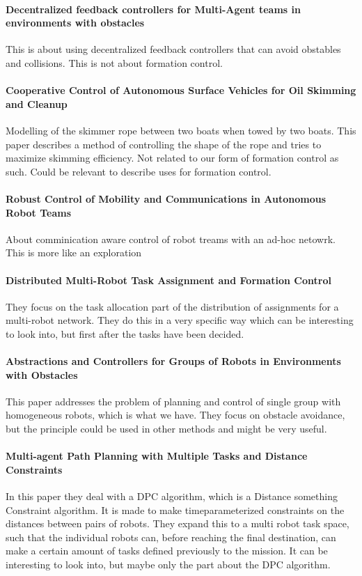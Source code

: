 {\vskip0pt\color{gray}
\paragraph{Decentralized feedback controllers for Multi-Agent teams in environments with obstacles}
	This is about using decentralized feedback controllers that can
	avoid obstables and collisions. This is not about formation control.}

{\vskip0pt\color{gray}
\paragraph{Cooperative Control of Autonomous Surface Vehicles for Oil Skimming and Cleanup}
	Modelling of the skimmer rope between two boats when towed by two
	boats. This paper describes a method of controlling the shape of the
	rope and tries to maximize skimming efficiency. Not related to our
	form of formation control as such. Could be relevant to describe uses for
    formation control.}

{\vskip0pt\color{gray}
\paragraph{Robust Control of Mobility and Communications in Autonomous Robot Teams}
	About comminication aware control of robot treams with an ad-hoc
	netowrk. This is more like an exploration}

\paragraph{Distributed Multi-Robot Task Assignment and Formation Control}
They focus on the task allocation part of the distribution of assignments for a multi-robot network. They do this in a very specific way which can be interesting to look into, but first after the tasks have been decided.

\paragraph{Abstractions and Controllers for Groups of Robots in Environments with Obstacles}
This paper addresses the problem of planning and control of single group with homogeneous robots, which is what we have. They focus on obstacle avoidance, but the principle could be used in other methods and might be very useful.

\paragraph{Multi-agent Path Planning with Multiple Tasks and Distance Constraints}
In this paper they deal with a DPC algorithm, which is a Distance something Constraint algorithm. It is made to make timeparameterized constraints on the distances between pairs of robots. They expand this to a multi robot task space, such that the individual robots can, before reaching the final destination, can make a certain amount of tasks defined previously to the mission.
It can be interesting to look into, but maybe only the part about the DPC algorithm.

